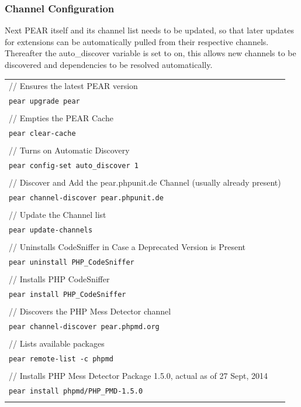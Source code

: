 \documentclass[]{report}
\begin{document}
\subsubsection{Channel Configuration}

Next PEAR itself and its channel list needs to be updated, so that later updates for extensions can be automatically pulled from their respective channels. Thereafter the auto\_discover variable is set to on, this allows new channels to be discovered and dependencies to be resolved automatically.\\


\begin{tabular}{l}
// Ensures the latest PEAR version\\
\texttt{pear upgrade pear}\\
\\
// Empties the PEAR Cache\\
\texttt{pear clear-cache}\\
\\
// Turns on Automatic Discovery\\
\texttt{pear config-set auto\_discover 1}\\
\\
// Discover and Add the pear.phpunit.de Channel (usually already present)\\
\texttt{pear channel-discover pear.phpunit.de}\\
\\
// Update the Channel list\\
\texttt{pear update-channels}\\
\\
// Uninstalls CodeSniffer in Case a Deprecated Version is Present\\
\texttt{pear uninstall PHP\_CodeSniffer}\\
\\
// Installs PHP CodeSniffer\\
\texttt{pear install PHP\_CodeSniffer}\\
\\
// Discovers the PHP Mess Detector channel\\
\texttt{pear channel-discover pear.phpmd.org}\\
\\
// Lists available packages\\
\texttt{pear remote-list -c phpmd}\\
\\
// Installs PHP Mess Detector Package 1.5.0, actual as of 27 Sept, 2014\\
\texttt{pear install phpmd/PHP\_PMD-1.5.0}\\ \\
\end{tabular}
\end{document}
